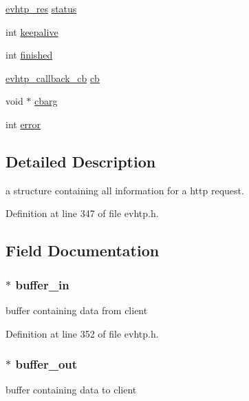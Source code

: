 \begin{DoxyCompactItemize}
\item 
\hyperlink{evhtp_8h_ac6ada2a29bcb7a7ddcfdcabc0d37022a}{evhtp\_\-res} \hyperlink{structevhtp__request__s_a9342eb644f9122b975cf9e2aed3cc00c}{status}
\item 
int \hyperlink{structevhtp__request__s_ae314c4b48027be9feab52906b6313b73}{keepalive}
\item 
int \hyperlink{structevhtp__request__s_a49c6e6c75d41d6360253beb518425934}{finished}
\item 
\hyperlink{evhtp_8h_ae907dbe36b762aa2da912cedb57268d0}{evhtp\_\-callback\_\-cb} \hyperlink{structevhtp__request__s_a783ee29046d4ff3e8c75f811e80fd57b}{cb}
\item 
void $\ast$ \hyperlink{structevhtp__request__s_aafd3d1a6343925cb274875556a6faa0e}{cbarg}
\item 
int \hyperlink{structevhtp__request__s_a11614f44ef4d939bdd984953346a7572}{error}
\end{DoxyCompactItemize}


\subsection{Detailed Description}
a structure containing all information for a http request. 

Definition at line 347 of file evhtp.h.



\subsection{Field Documentation}
\hypertarget{structevhtp__request__s_ad9e8b203574b6c44296b23b897206768}{
\subsubsection[{buffer\_\-in}]{$\ast$ {\bf buffer\_\-in}}}
\label{structevhtp__request__s_ad9e8b203574b6c44296b23b897206768}
buffer containing data from client 

Definition at line 352 of file evhtp.h.

\hypertarget{structevhtp__request__s_aa2a97cf41f1776b60c84e31eb6778d05}{
\subsubsection[{buffer\_\-out}]{$\ast$ {\bf buffer\_\-out}}}
\label{structevhtp__request__s_aa2a97cf41f1776b60c84e31eb6778d05}
buffer containing data to client 

